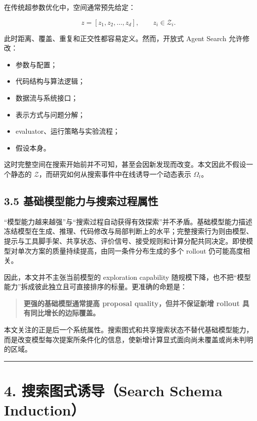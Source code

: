 \documentclass[
  11pt]{ctexart}
\providecommand{\tightlist}{%
  \setlength{\itemsep}{0pt}\setlength{\parskip}{0pt}}
\begin{document}
在传统超参数优化中，空间通常预先给定：

\[
z=[z_1,z_2,\ldots,z_d], \qquad z_i \in \mathcal{Z}_i.
\]

此时距离、覆盖、重复和正交性都容易定义。然而，开放式 Agent Search
允许修改：

\begin{itemize}
\tightlist
\item
  参数与配置；
\item
  代码结构与算法逻辑；
\item
  数据流与系统接口；
\item
  表示方式与问题分解；
\item
  evaluator、运行策略与实验流程；
\item
  假设本身。
\end{itemize}

这时完整空间在搜索开始前并不可知，甚至会因新发现而改变。本文因此不假设一个静态的
\(\mathcal{Z}\)，而研究如何从搜索事件中在线诱导一个动态表示
\(\Omega_t\)。

\subsection{3.5
基础模型能力与搜索过程属性}\label{ux57faux7840ux6a21ux578bux80fdux529bux4e0eux641cux7d22ux8fc7ux7a0bux5c5eux6027}

``模型能力越来越强''与``搜索过程自动获得有效探索''并不矛盾。基础模型能力描述冻结模型在生成、推理、代码修改与局部判断上的水平；完整搜索行为则由模型、提示与工具脚手架、共享状态、评价信号、接受规则和计算分配共同决定。即使模型对单次方案的质量持续提高，由同一条件分布生成的多个
rollout 仍可能高度相关。

因此，本文并不主张当前模型的 exploration capability
随规模下降，也不把``模型能力''拆成彼此独立且可直接排序的标量。更准确的命题是：

\begin{quote}
\textbf{更强的基础模型通常提高 proposal quality，但并不保证新增 rollout
具有同比增长的边际覆盖。}
\end{quote}

本文关注的正是后一个系统属性。搜索图式和共享搜索状态不替代基础模型能力，而是改变模型每次提案所条件化的信息，使新增计算显式面向尚未覆盖或尚未判明的区域。

\begin{center}\rule{0.5\linewidth}{0.5pt}\end{center}

\section{4. 搜索图式诱导（Search Schema
Induction）}\label{ux641cux7d22ux56feux5f0fux8bf1ux5bfcsearch-schema-induction}
\end{document}
